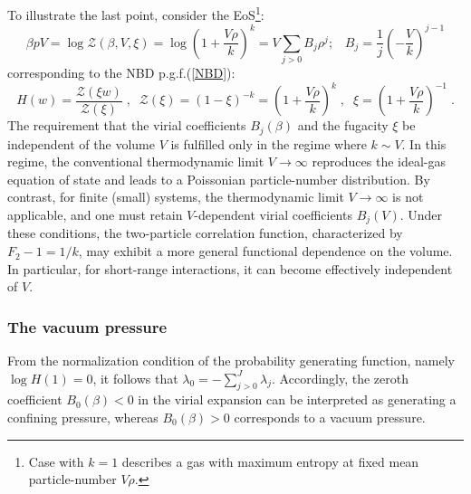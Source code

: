 \documentclass[a4paper,12pt]{amsart}
\theoremstyle{definition}
\theoremstyle{remark}
\begin{document}
To illustrate the last point, consider the EoS\footnote{Case with $k=1$ describes a gas with maximum entropy at fixed mean particle-number $V\rho$.}:
\begin{equation}
 \beta pV =\log \mathcal{Z}(\beta, V,\xi)= \log \left(1\!+\!\frac{V\rho}{k}\right)^k =
V\sum_{j>0}B_j\rho^j;\;\;\; B_j= \frac{1}{j} \left(-\frac{V}{k}\right)^{j-1}
\end{equation}
corresponding to the NBD p.g.f.(\ref{NBD}):
\[
H(w)=\frac{\mathcal{Z}(\xi w)}{\mathcal{Z}(\xi)}\;,\;\; \mathcal{Z}(\xi) = (1-\xi)^{-k}= \left(1\!+\!\frac{V\rho}{k}\right)^k\;,\;\; \xi=\left(1\!+\!\frac{V\rho}{k}\right)^{-1}\;.
\]
The requirement that the virial coefficients $B_j(\beta)$ and the fugacity $\xi$ be independent of the volume $V$ is fulfilled only in the regime where $k \sim V$. In this regime, the conventional thermodynamic limit $V \to \infty$ reproduces the ideal-gas equation of state and leads to a Poissonian particle-number distribution. By contrast, for finite (small) systems, the thermodynamic limit $V \to \infty$ is not applicable, and one must retain $V$-dependent virial coefficients $B_j(V)$. Under these conditions, the two-particle correlation function, characterized by $F_2 - 1 = 1/k$, may exhibit a more general functional dependence on the volume. In particular, for short-range interactions, it can become effectively independent of $V$.

\subsubsection{The vacuum pressure} \label{vacpres}
From the normalization condition of the probability generating function, namely $\log H(1) = 0$, it follows that $\lambda_0 = -\sum_{j>0}^{J} \lambda_j$. Accordingly, the zeroth coefficient $B_0(\beta) < 0$ in the virial expansion can be interpreted as generating a confining pressure, whereas $B_0(\beta) > 0$ corresponds to a vacuum pressure.  

\end{document}
